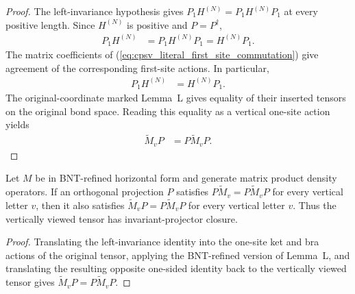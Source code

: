 \begin{proof}\leanok
    The left-invariance hypothesis gives
    $P_1H^{(N)}=P_1H^{(N)}P_1$ at every positive length. Since $H^{(N)}$ is
    positive and $P=P^\dagger$,
    \begin{align}
        P_1H^{(N)} & =P_1H^{(N)}P_1=H^{(N)}P_1.
        \label{eq:cpsv_literal_first_site_commutation}
    \end{align}
    The matrix coefficients of
    (\ref{eq:cpsv_literal_first_site_commutation}) give agreement of the
    corresponding first-site actions. In particular,
    \begin{align}
        P_1H^{(N)} & =H^{(N)}P_1.
        \label{eq:cpsv_prop_4_13_first_site}
    \end{align}
    The original-coordinate marked Lemma~L gives equality of their inserted
    tensors on the original bond space. Reading this equality as a vertical
    one-site action yields
    \begin{align}
        \widetilde M_vP & =P\widetilde M_vP.
        \label{eq:cpsv_prop_4_13_projector_closure}
    \end{align}
\end{proof}

\begin{lemma}
    \label{thm:mpdo_vertical_projector_closure}
    \leanok
    Let $M$ be in BNT-refined horizontal form and generate matrix
    product density operators. If an orthogonal projection $P$ satisfies
    $P\widetilde M_v=P\widetilde M_vP$ for every vertical letter $v$, then it
    also satisfies $\widetilde M_vP=P\widetilde M_vP$ for every vertical
    letter $v$. Thus the vertically viewed tensor has invariant-projector
    closure.
\end{lemma}

\begin{proof}
    \leanok
    Translating the left-invariance identity into the one-site ket and bra
    actions of the original tensor, applying the BNT-refined
    version of Lemma~L, and translating the resulting opposite one-sided
    identity back to the vertically viewed tensor gives
    $\widetilde M_vP=P\widetilde M_vP$.
\end{proof}

